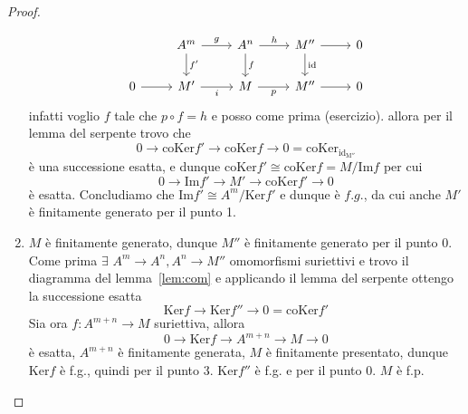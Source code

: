 \begin{proof}{}
\begin{enumerate}[label = \arabic*.]
\[\begin{tikzcd}
	 & A^{m} & A^{n} & M'' & 0 \\
	0 & M' & M & M'' & 0
	\arrow["g", from=1-2, to=1-3]
	\arrow["{f'}", from=1-2, to=2-2]
	\arrow["h", from=1-3, to=1-4]
	\arrow["f", from=1-3, to=2-3]
	\arrow[from=1-4, to=1-5]
	\arrow["{\mathrm{id}}", from=1-4, to=2-4]
	\arrow[from=2-1, to=2-2]
	\arrow["i"', from=2-2, to=2-3]
	\arrow["p"', from=2-3, to=2-4]
	\arrow[from=2-4, to=2-5]
\end{tikzcd}\]
    infatti voglio \(f\) tale che \(p \circ f = h\) e posso come prima (esercizio).
    allora per il lemma del serpente trovo che
    \[
      0 \to \mathrm{coKer}f' \to \mathrm{coKer}f \to 0 = \mathrm{coKer_{
              \mathrm{id}_{M''}
      } }
    \]
    è una successione esatta, e dunque \(\mathrm{coKer}f' \cong \mathrm{coKer}f = M / \mathrm{Im} f\) per cui
    \[
    0 \to \mathrm{Im}f' \to M' \to \mathrm{coKer}f' \to 0
    \]
    è esatta. Concludiamo che \(\mathrm{Im} f' \cong A^{m} / \mathrm{Ker} f'\) e
    dunque è \(f.g.\), da cui anche \(M'\) è finitamente generato per il punto
    1.
    \item \(M\) è finitamente generato, dunque \(M''\) è finitamente generato
        per il punto 0. Come prima \(\exists\,\, A^{m} \to A^{n}, A^{n} \to M''\)
        omomorfismi suriettivi e trovo il diagramma del lemma~\ref{lem:com} e
        applicando il lemma del serpente ottengo la successione esatta
        \[
          \mathrm{Ker} f \to \mathrm{Ker}f'' \to 0 = \mathrm{coKer}f'
        \]
        Sia ora \(f: A^{m+n}\to M\) suriettiva, allora 
        \[
          0 \to \mathrm{Ker} f \to A^{m+n} \to M \to 0
        \]
        è esatta, \(A^{m+n}\) è finitamente generata, \(M\) è finitamente
        presentato, dunque \(\mathrm{Ker}f\) è f.g., quindi per il punto 3. \(\mathrm{Ker}f''\) è f.g. e per il punto 0. \(M\) è f.p.
\end{enumerate}
\end{proof}

